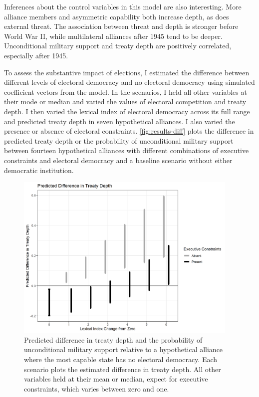 \documentclass[12pt]{article}
\begin{document}
Inferences about the control variables in this model are also interesting.
More alliance members and asymmetric capability both increase depth, as does external threat.
The association between threat and depth is stronger before World War II, while multilateral alliances after 1945 tend to be deeper. 
Unconditional military support and treaty depth are positively correlated, especially after 1945. 


To assess the substantive impact of elections, I estimated the difference between different levels of electoral democracy and no electoral democracy using simulated coefficient vectors from the model. 
In the scenarios, I held all other variables at their mode or median and varied the values of electoral competition and treaty depth. 
I then varied the lexical index of electoral democracy across its full range and predicted treaty depth in seven hypothetical alliances. 
I also varied the presence or absence of electoral constraints. 
\autoref{fig:results-diff} plots the difference in predicted treaty depth or the probability of unconditional military support between fourteen hypothetical alliances with different combinations of executive constraints and electoral democracy and a baseline scenario without either democratic institution. 


\begin{figure}[hbtp]
\centering
\includegraphics[width=0.95\textwidth]{../figures/results-diff.png}
\caption{Predicted difference in treaty depth and the probability of unconditional military support relative to a hypothetical alliance where the most capable state has no electoral democracy. Each scenario plots the estimated difference in treaty depth. All other variables held at their mean or median, expect for executive constraints, which varies between zero and one.}
\label{fig:results-diff}
\end{figure}
\end{document}
